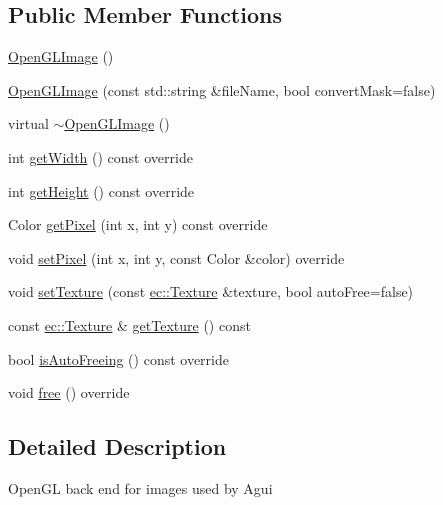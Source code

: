 \subsection*{Public Member Functions}
\begin{DoxyCompactItemize}
\item 
\mbox{\hyperlink{classagui_1_1_open_g_l_image_a0f58c2049c07f32e8bb01aad01997a80}{Open\+G\+L\+Image}} ()
\item 
\mbox{\hyperlink{classagui_1_1_open_g_l_image_a218cb6cfd4cbefbf50a87160fcba234f}{Open\+G\+L\+Image}} (const std\+::string \&file\+Name, bool convert\+Mask=false)
\item 
virtual \mbox{\hyperlink{classagui_1_1_open_g_l_image_aee49d8be1e992147614b9a78d6cf848c}{$\sim$\+Open\+G\+L\+Image}} ()
\item 
int \mbox{\hyperlink{classagui_1_1_open_g_l_image_a065277a19487d6e5e961ba39706f8084}{get\+Width}} () const override
\item 
int \mbox{\hyperlink{classagui_1_1_open_g_l_image_a6f08a29892fefbfda75f62cabcf03661}{get\+Height}} () const override
\item 
Color \mbox{\hyperlink{classagui_1_1_open_g_l_image_acea75a4849d6e14c608bc93be52e20c4}{get\+Pixel}} (int x, int y) const override
\item 
void \mbox{\hyperlink{classagui_1_1_open_g_l_image_a149afec919d0975af4fc48a078c183e2}{set\+Pixel}} (int x, int y, const Color \&color) override
\item 
void \mbox{\hyperlink{classagui_1_1_open_g_l_image_a03acc22714dca9ff6b5145cf51490ffd}{set\+Texture}} (const \mbox{\hyperlink{classec_1_1_texture}{ec\+::\+Texture}} \&texture, bool auto\+Free=false)
\item 
const \mbox{\hyperlink{classec_1_1_texture}{ec\+::\+Texture}} \& \mbox{\hyperlink{classagui_1_1_open_g_l_image_a7a2025b69dd0e462c8b46d97532d3036}{get\+Texture}} () const
\item 
bool \mbox{\hyperlink{classagui_1_1_open_g_l_image_a55e602c6c198ce24b48c1e4ca60c0798}{is\+Auto\+Freeing}} () const override
\item 
void \mbox{\hyperlink{classagui_1_1_open_g_l_image_ac6012525bdebca732f9ee527b4f385f2}{free}} () override
\end{DoxyCompactItemize}


\subsection{Detailed Description}
Open\+GL back end for images used by Agui 

